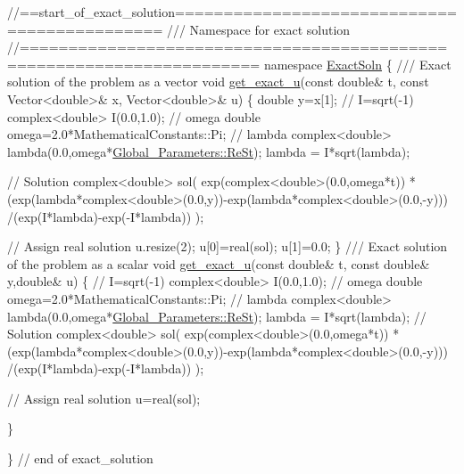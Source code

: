  
\begin{DoxyCodeInclude}
\textcolor{comment}{//==start\_of\_exact\_solution=============================================}
\textcolor{comment}{/// Namespace for exact solution}
\textcolor{comment}{}\textcolor{comment}{//======================================================================}
\textcolor{keyword}{namespace }\hyperlink{namespaceExactSoln}{ExactSoln}
\{
 \textcolor{comment}{}
\textcolor{comment}{ /// Exact solution of the problem as a vector}
\textcolor{comment}{} \textcolor{keywordtype}{void} \hyperlink{namespaceExactSoln_a2598550281dd62f4160edb3d0b2e5432}{get\_exact\_u}(\textcolor{keyword}{const} \textcolor{keywordtype}{double}& t, \textcolor{keyword}{const} Vector<double>& x, Vector<double>& u)
 \{
  \textcolor{keywordtype}{double} y=x[1];
  \textcolor{comment}{// I=sqrt(-1)}
  complex<double> I(0.0,1.0);
  \textcolor{comment}{// omega}
  \textcolor{keywordtype}{double} omega=2.0*MathematicalConstants::Pi;
  \textcolor{comment}{// lambda}
  complex<double> lambda(0.0,omega*\hyperlink{namespaceGlobal__Parameters_a7a59a32365e87566069e458dc83bd18a}{Global\_Parameters::ReSt});
  lambda = I*sqrt(lambda);

  \textcolor{comment}{// Solution}
  complex<double> sol(
   exp(complex<double>(0.0,omega*t)) * 
   (exp(lambda*complex<double>(0.0,y))-exp(lambda*complex<double>(0.0,-y)))
   /(exp(I*lambda)-exp(-I*lambda)) );
  
  \textcolor{comment}{// Assign real solution}
  u.resize(2);
  u[0]=real(sol);
  u[1]=0.0;
 \}
\textcolor{comment}{}
\textcolor{comment}{ /// Exact solution of the problem as a scalar}
\textcolor{comment}{} \textcolor{keywordtype}{void} \hyperlink{namespaceExactSoln_a2598550281dd62f4160edb3d0b2e5432}{get\_exact\_u}(\textcolor{keyword}{const} \textcolor{keywordtype}{double}& t, \textcolor{keyword}{const} \textcolor{keywordtype}{double}& y,\textcolor{keywordtype}{double}& u)
 \{
  \textcolor{comment}{// I=sqrt(-1)}
  complex<double> I(0.0,1.0);
  \textcolor{comment}{// omega}
  \textcolor{keywordtype}{double} omega=2.0*MathematicalConstants::Pi;
  \textcolor{comment}{// lambda}
  complex<double> lambda(0.0,omega*\hyperlink{namespaceGlobal__Parameters_a7a59a32365e87566069e458dc83bd18a}{Global\_Parameters::ReSt});
  lambda = I*sqrt(lambda);
  \textcolor{comment}{// Solution}
  complex<double> sol(
   exp(complex<double>(0.0,omega*t)) * 
   (exp(lambda*complex<double>(0.0,y))-exp(lambda*complex<double>(0.0,-y)))
   /(exp(I*lambda)-exp(-I*lambda)) );

  \textcolor{comment}{// Assign real solution}
  u=real(sol);

 \}

\} \textcolor{comment}{// end of exact\_solution}

\end{DoxyCodeInclude}




